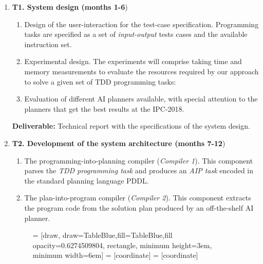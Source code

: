 \documentclass[10pt,a4paper]{paper}
\begin{document}
\begin{enumerate}
\item {\bf T1. System design (months 1-6})
  \begin{small}
    \begin{enumerate}
    \item Design of the user-interaction for the test-case specification. Programming tasks are specified as a set of {\em input-output} tests cases and the available instruction set. 
    \item Experimental design. The experiments will comprise taking time and memory measurements to evaluate the resources required by our approach to solve a given set of TDD programming tasks:
      \item Evaluation of different AI planners available, with special attention to the planners that get the best results at the IPC-2018. 
      \end{enumerate}
  \end{small}

{\small {\bf Deliverable:} Technical report with the specifications of the system design.}
  
  \item {\bf T2. Development of the system architecture (months 7-12})
    \begin{small}
      \begin{enumerate}
      \item The programming-into-planning compiler ({\em Compiler 1}). This component parses the {\em TDD programming task} and produces an {\em AIP task} encoded in the standard planning language PDDL.
      \item The plan-into-program compiler ({\em Compiler 2}). This component extracts the program code from the solution plan produced by an off-the-shelf AI planner.
      \end{enumerate}
\end{small}      


\begin{figure}[hbt!]
 = [draw, draw=TableBlue,fill=TableBlue,fill opacity=0.6274509804, rectangle, minimum height=3em, minimum width=6em]
 = [coordinate]
 = [coordinate]
\begin{center}
\end{center}
\end{figure}
\end{enumerate}
\end{document}
